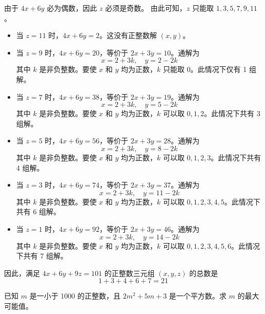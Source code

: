 \begin{questions}
\begin{solution}
由于 $4x + 6y$ 必为偶数，因此 $z$ 必须是奇数。
由此可知，$z$ 只能取 $1, 3, 5, 7, 9, 11$。
\begin{itemize}
    \item 当 $z = 11$ 时，$4x + 6y = 2$。这没有正整数解 $(x, y)$。
    \item 当 $z = 9$ 时，$4x + 6y = 20$，等价于 $2x + 3y = 10$。通解为
    \[ x = 2 + 3k, \quad y = 2 - 2k \]
    其中 $k$ 是非负整数。要使 $x$ 和 $y$ 均为正数，$k$ 只能取 0。此情况下仅有 1 组解。
    \item 当 $z = 7$ 时，$4x + 6y = 38$，等价于 $2x + 3y = 19$。通解为
    \[ x = 2 + 3k, \quad y = 5 - 2k \]
    其中 $k$ 是非负整数。要使 $x$ 和 $y$ 均为正数，$k$ 可以取 $0, 1, 2$。此情况下共有 3 组解。
    \item 当 $z = 5$ 时，$4x + 6y = 56$，等价于 $2x + 3y = 28$。通解为
    \[ x = 2 + 3k, \quad y = 8 - 2k \]
    其中 $k$ 是非负整数。要使 $x$ 和 $y$ 均为正数，$k$ 可以取 $0, 1, 2, 3$。此情况下共有 4 组解。
    \item 当 $z = 3$ 时，$4x + 6y = 74$，等价于 $2x + 3y = 37$。通解为
    \[ x = 2 + 3k, \quad y = 11 - 2k \]
    其中 $k$ 是非负整数。要使 $x$ 和 $y$ 均为正数，$k$ 可以取 $0, 1, 2, 3, 4, 5$。此情况下共有 6 组解。
    \item 当 $z = 1$ 时，$4x + 6y = 92$，等价于 $2x + 3y = 46$。通解为
    \[ x = 2 + 3k, \quad y = 14 - 2k \]
    其中 $k$ 是非负整数。要使 $x$ 和 $y$ 均为正数，$k$ 可以取 $0, 1, 2, 3, 4, 5, 6$。此情况下共有 7 组解。
\end{itemize}
因此，满足 $4x + 6y + 9z = 101$ 的正整数三元组 $(x, y, z)$ 的总数是
\[ 1 + 3 + 4 + 6 + 7 = 21  \]
\end{solution}

\question 已知 $m$ 是一小于 1000 的正整数，且 $2m^2 + 5m + 3$ 是一个平方数。求 $m$ 的最大可能值。


\end{questions}
